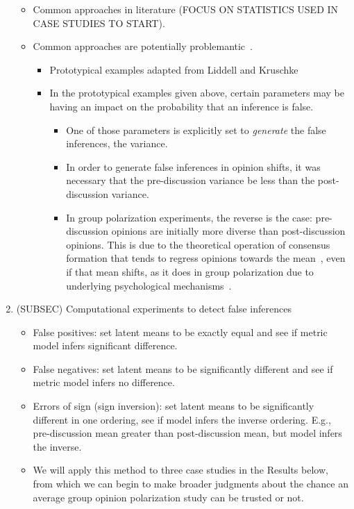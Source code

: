 \documentclass[11pt,letterpaper]{article}
\begin{document}
\begin{enumerate}
    \begin{itemize}
      \item 
        Common approaches in literature 
        (FOCUS ON STATISTICS USED IN CASE STUDIES TO START).
      \item 
        Common approaches are potentially problemantic~\cite{Liddell2018}.
        \begin{itemize}
          \item
            Prototypical examples adapted from Liddell and Kruschke
          \item 
            In the prototypical examples given above, certain parameters
            may be having an impact on the probability that an inference is
            false. 
            \begin{itemize}
              \item 
                One of those parameters is explicitly set to \emph{generate}
                the false inferences, the variance. 
              \item
                In order to generate false inferences in opinion shifts, 
                it was necessary that the pre-discussion variance be
                less than the post-discussion variance. 
              \item
                In group polarization experiments, the reverse is the case:
                pre-discussion opinions are initially more diverse than
                post-discussion opinions. This is due to the theoretical 
                operation of consensus formation that tends to regress opinions
                towards the mean~\cite{French1956,DeGroot1974}, even if that mean
                shifts, as it does in group polarization due to underlying
                psychological mechanisms~\cite{Sieber2019,Turner2020}.
            \end{itemize}
        \end{itemize}
    \end{itemize}

  \item
    (SUBSEC)
    Computational experiments to detect false inferences
    \begin{itemize}
      \item 
        False positives: set latent means to be exactly equal and see if
        metric model infers significant difference.
      \item 
        False negatives: set latent means to be significantly different
        and see if metric model infers no difference.
      \item 
        Errors of sign (sign inversion): set latent means to be significantly
        different in one ordering, see if model infers the inverse ordering.
        E.g., pre-discussion mean greater than
        post-discussion mean, but model infers the inverse.
      \item
        We will apply this method to three case studies in the Results below,
        from which we can begin to make broader judgments about the chance
        an average group opinion polarization study can be trusted or not.
    \end{itemize}
\end{enumerate}
\end{document}
